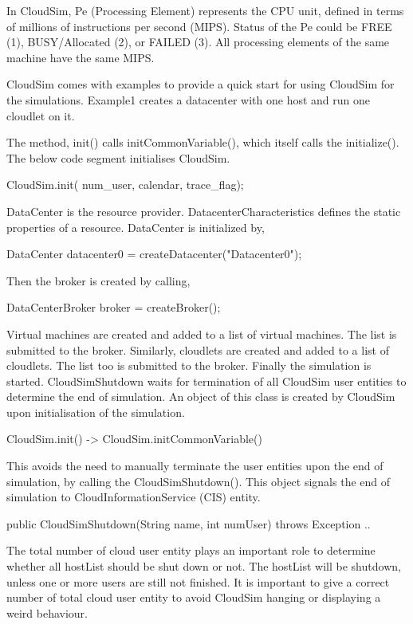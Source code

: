 \documentclass[times, 10pt,twocolumn]{article}
\begin{document}
In CloudSim, Pe (Processing Element) represents the CPU unit, defined in terms of millions of instructions per second (MIPS). Status of the Pe could be FREE (1), BUSY/Allocated (2), or FAILED (3). All processing elements of the same machine have the same MIPS.

CloudSim comes with examples to provide a quick start for using CloudSim for the simulations. Example1 creates a datacenter with one host and run one cloudlet on it. 

The method, init() calls initCommonVariable(), which itself calls the initialize(). The below code segment initialises CloudSim.
\begin{verbatimtab}
CloudSim.init(
    num_user, calendar, trace_flag);
\end{verbatimtab}
DataCenter is the resource provider. DatacenterCharacteristics defines the static properties of a resource. DataCenter is initialized by,
\begin{verbatimtab}
DataCenter datacenter0 = 
    createDatacenter("Datacenter0");
\end{verbatimtab}
Then the broker is created by calling,
\begin{verbatimtab}
DataCenterBroker broker = createBroker();
\end{verbatimtab}
Virtual machines are created and added to a list of virtual machines. The list is submitted to the broker. Similarly, cloudlets are created and added to a list of cloudlets. The list too is submitted to the broker. Finally the simulation is started.
CloudSimShutdown waits for termination of all CloudSim user entities to determine the end of simulation. An object of this class is created by CloudSim upon initialisation of the simulation.
\begin{verbatimtab}
CloudSim.init() -> 
    CloudSim.initCommonVariable()
\end{verbatimtab}
This avoids the need to manually terminate the user entities upon the end of simulation, by calling the CloudSimShutdown(). This object signals the end of simulation to CloudInformationService (CIS) entity.
\begin{verbatimtab}
public CloudSimShutdown(String name,
    int numUser) throws Exception { .. }
\end{verbatimtab}
The total number of cloud user entity plays an important role to determine whether all hostList should be shut down or not. The hostList will be shutdown, unless one or more users are still not finished. It is important to give a correct number of total cloud user entity to avoid CloudSim hanging or displaying a weird behaviour.
\end{document}
